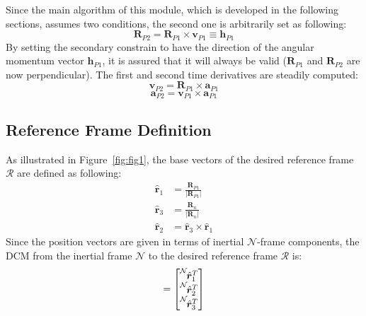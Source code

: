 Since the main algorithm of this module, which is developed in the following sections, assumes two conditions, the second one is arbitrarily set as following:
\begin{equation}
		 \bm{R}_{P2} = \bm{R}_{P1} \times \bm{v}_{P1} \equiv  \bm{h}_{P1}
\end{equation}
By setting the secondary constrain to have the direction of the angular momentum vector $ \bm{h}_{P1}$, it is assured that it will always be valid ($\bm{R}_{P1}$ and $\bm{R}_{P2}$ are now perpendicular).
The first and second time derivatives are steadily computed:
\begin{equation}
	\bm{v}_{P2} =  \bm{R}_{P1} \times \bm{a}_{P1} 
\end{equation}
\begin{equation}
	\bm{a}_{P2} =  \bm{v}_{P1} \times \bm{a}_{P1} 
\end{equation}
\subsection{Reference Frame Definition}
As illustrated in Figure~\ref{fig:fig1}, the base vectors of the desired reference frame $\mathcal{R}$  are defined as following:
\begin{subequations}
	\begin{align}
		\hat{\bm r}_{1} &= \frac{{\bm R}_{P1}} {|{\bm R}_{P1}|} \\
		\hat{\bm r}_{3} &= \frac{{\bm R}_{n}}{|{\bm R}_{n}|} \\
		\hat{\bm r}_{2} &=  \hat{\bm r}_{3} \times \hat{\bm r}_{1} 
	\end{align}
\end{subequations}
Since the position vectors are given in terms of inertial $\mathcal{N}$-frame components, the DCM from the inertial frame $\mathcal{N}$ to the desired reference frame $\mathcal{R}$ is:
\begin{equation}
	[RN] = \begin{bmatrix}
		\leftexp{N}{ \hat{\bm r}_{1}^{T} } \\
		\leftexp{N}{ \hat{\bm r}_{2}^{T} }  \\
		\leftexp{N}{ \hat{\bm r}_{3}^{T} }  
	\end{bmatrix}
\end{equation}

